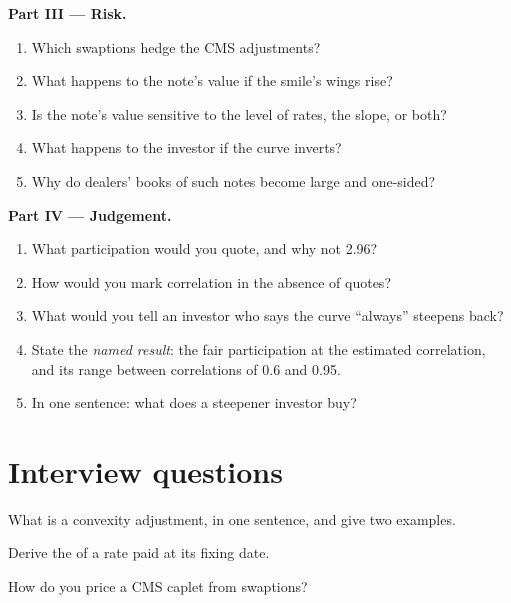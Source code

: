 \begin{problem}
\medskip\noindent\textbf{Part III --- Risk.}
\begin{enumerate}[resume]
\item Which swaptions hedge the CMS adjustments?
\item What happens to the note's value if the smile's wings rise?
\item Is the note's value sensitive to the level of rates, the slope, or both?
\item What happens to the investor if the curve inverts?
\item Why do dealers' books of such notes become large and one-sided?
\end{enumerate}

\medskip\noindent\textbf{Part IV --- Judgement.}
\begin{enumerate}[resume]
\item What participation would you quote, and why not 2.96?
\item How would you mark correlation in the absence of quotes?
\item What would you tell an investor who says the curve ``always'' steepens back?
\item State the \emph{named result}: the fair participation at the estimated
correlation, and its range between correlations of 0.6 and 0.95.
\item In one sentence: what does a steepener investor buy?
\end{enumerate}
\end{problem}

\section{Interview questions}

\begin{interviewq}\label{iq:rc:convexity-adjustments-and-constant-maturity-products:1}
What is a convexity adjustment, in one sentence, and give two examples.
\end{interviewq}

\begin{interviewq}\label{iq:rc:convexity-adjustments-and-constant-maturity-products:2}
Derive the  of a rate paid at its fixing date.
\end{interviewq}

\begin{interviewq}\label{iq:rc:convexity-adjustments-and-constant-maturity-products:3}
How do you price a CMS caplet from swaptions?
\end{interviewq}

